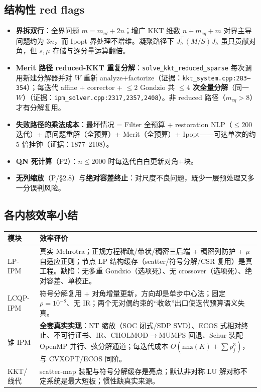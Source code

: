 \documentclass[11pt,a4paper]{ctexart}
\newcommand{\file}[1]{\texttt{#1}}
\newcommand{\func}[1]{\texttt{#1}}
\newcommand{\evid}[1]{{\footnotesize\color{black!70}（证据：#1）}}
\begin{document}
\subsection{结构性 red flags}
\begin{itemize}[leftmargin=2em]
  \item \textbf{界拆双行}：全界问题 $m = m_{nl} + 2n$；增广 KKT 维数 $n + m_{eq} + m$ 对界主导问题约为 $3n$，而 Ipopt 界处理不增维。凝聚路径下 $J_h^{\top}(M/S)J_h$ 虽只贡献对角，但 $s,\mu$ 存储与逐分量运算翻倍。
  \item \textbf{Merit 路径 reduced-KKT 重复分解}：\func{solve\_kkt\_reduced\_sparse} 每次调用新建分解器并对 $W$ 重新 analyze+factorize\evid{\file{kkt\_system.cpp:283--354}}；每迭代 affine + corrector + $\le 2$ Gondzio 共 \textbf{$\le 4$ 次全量分解}（同一 $W$）\evid{\file{ipm\_solver.cpp:2317,2357,2408}}。非 reduced 路径（$m_{eq}>8$）才有分解复用。
  \item \textbf{失败路径的乘法成本}：最坏情况 = Filter 全预算 + restoration NLP（$\le 200$ 迭代）+ 原问题重解（全预算）+ Merit（全预算）+ Ipopt——可达单次的约 5 倍挂钟\evid{1877--2108}。
  \item \textbf{QN 死计算}（P2）：$n\le 2000$ 时每迭代白白更新对角+块。
  \item \textbf{无列缩放}（P/\S2.8）与\textbf{绝对容差终止}：对尺度不良问题，既少一层预处理又多一分误判风险。
\end{itemize}

\subsection{各内核效率小结}
\begin{center}\footnotesize
\begin{tabular}{@{}p{2.6cm}p{11.8cm}@{}}
\toprule
模块 & 效率评价 \\
\midrule
LP-IPM & 真实 Mehrotra；正规方程稀疏/带状/稠密三后端 + 稠密列防护 + $\mu$ 自适应正则；节点 LP 结构缓存（scatter/符号分解/CSR 复用）是真工程。缺陷：无多重 Gondzio（选项死）、无 crossover（选项死）、绝对容差、单校正。 \\
LCQP-IPM & 符号分解复用 + 对角增量更新，方向却是单步中心法；固定 $\rho{=}10^{-8}$、无 IR；两个无对偶约束的``收敛''出口使迭代预算语义失真。 \\
锥 IPM & \textbf{全套真实实现}：NT 缩放（SOC 闭式/SDP SVD）、ECOS 式相对终止、不可行证书、IR、CHOLMOD$\to$MUMPS 回退、Schur 装配 OpenMP 并行、弦分解通道；每迭代成本 $O(\mathrm{nnz}(K){+}\sum p_j^3)$，与 CVXOPT/ECOS 同阶。 \\
KKT/线代 & scatter-map 装配与符号分解缓存是亮点；默认非对称 LU 解对称不定系统是最大短板；惯性缺真实来源。 \\
\bottomrule
\end{tabular}
\end{center}
\end{document}
